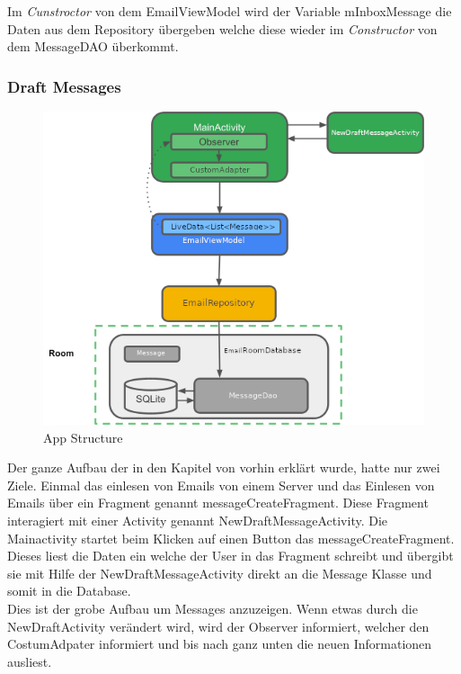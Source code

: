 \documentclass[a4paper,11pt]{article}
\begin{document}
Im \textit{Cunstroctor} von dem EmailViewModel wird der Variable mInboxMessage die Daten aus dem Repository übergeben welche diese wieder im \textit{Constructor} von dem MessageDAO überkommt.


\subsubsection{Draft Messages}

\begingroup
\setlength{\intextsep}{1pt}
\setlength{\columnsep}{4pt}


\begin{figure}
    \centering
    \includegraphics[width=.55\textwidth, height=.55\textwidth]{media/AppStructure.png}
    \caption{App Structure \cite{appStructurePicture}}
\end{figure}

Der ganze Aufbau der in den Kapitel von vorhin erklärt wurde, hatte nur zwei Ziele. Einmal das einlesen von Emails von einem Server und das Einlesen von Emails
über ein Fragment genannt messageCreateFragment. Diese Fragment interagiert mit einer Activity genannt NewDraftMessageActivity. Die Mainactivity startet beim Klicken auf einen Button 
das messageCreateFragment. Dieses liest die Daten ein welche der User in das Fragment schreibt und übergibt sie mit Hilfe der NewDraftMessageActivity direkt an die Message Klasse und somit in die 
Database.  \\

Dies ist der grobe Aufbau um Messages anzuzeigen. Wenn etwas durch die NewDraftActivity verändert wird, wird der Observer informiert, welcher den CostumAdpater informiert und bis nach 
ganz unten die neuen Informationen ausliest.

\end{document}
